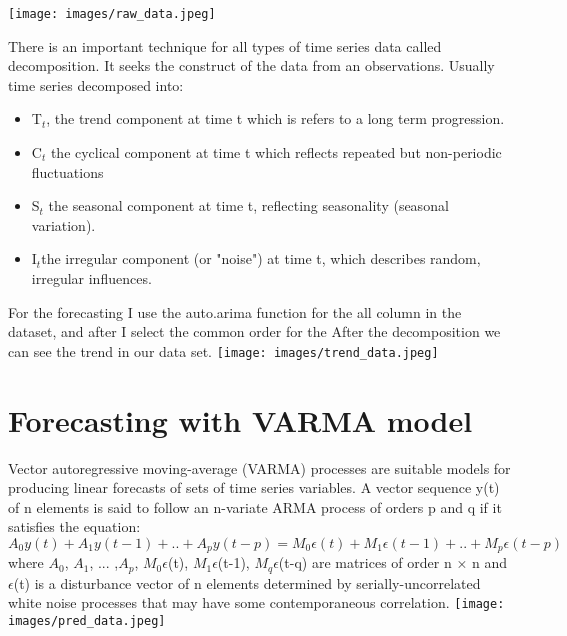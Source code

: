 \documentclass{article}
\begin{document}
\texttt{[image: images/raw\_data.jpeg]}

There is an important technique for all types of time series data called decomposition. It seeks the construct of the data from an observations. Usually time series decomposed into:
\begin{itemize}
    \item T$_t$, the trend component at time t which is refers to a long term progression.
    \item C$_t$ the cyclical component at time t which reflects repeated but non-periodic fluctuations
    \item S$_t$ the seasonal component at time t, reflecting seasonality (seasonal variation).
    \item I$_t$the irregular component (or "noise") at time t, which describes random, irregular influences. 
\end{itemize}
For the forecasting I use the auto.arima function for the all column in the dataset, and after I select the common order for the 
After the decomposition we can see the trend in our data set.\newline    
\texttt{[image: images/trend\_data.jpeg]}

\section*{Forecasting with VARMA model}

Vector autoregressive moving-average (VARMA) processes are suitable models for producing linear forecasts of sets of time series variables. A vector sequence y(t) of n elements is said to follow an n-variate ARMA process of orders p and q if it satisfies the equation: 
\[
A_{0}y(t) + A_{1}y(t-1) + .. + A_{p}y(t-p) =
    M_{0}\epsilon(t) + M_{1}\epsilon(t-1)+ .. + M_{p}\epsilon(t-p)
\]
where $A_{0}$, $A_{1}$, ... ,$A_{p}$, $M_{0}\epsilon$(t), $M_{1}\epsilon$(t-1), $M_{q}\epsilon$(t-q) are matrices of order n × n and $\epsilon$(t) is a disturbance vector of n elements determined by serially-uncorrelated white noise processes that may have some contemporaneous correlation.
\texttt{[image: images/pred\_data.jpeg]}
\end{document}
